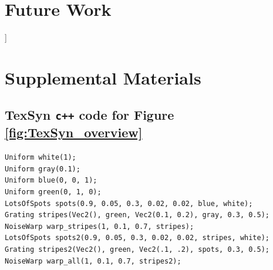 \documentclass[sigconf]{acmart}
\begin{document}
\section{Future Work}

\begin{acks}
\par
[... I've been working on this on and off since 2007, based on inspirations by papers in the early 1990s (Witkin/Kass, Turk, Angeline/Pollack, Sims) ...]
\par
[maybe just names (roughly backward in time): 
Ken Perlin,
Aaron Hertzmann,
Andrew Glassner,
Pat Hanrahan,
Karl Sims,
John Koza,
Richard Dawkins,
Witkin/Kass/Turk,
Peter Angeline,
Jordan Pollack.
and of course, Alan Turing. [too weird/maudlin? QQQ]
]
\end{acks}






\newpage
\appendix
\section{Supplemental Materials}
\subsection{TexSyn \texttt{c++} code for Figure \ref{fig:TexSyn_overview}}
\begin{small}
\begin{verbatim}
Uniform white(1);
Uniform gray(0.1);
Uniform blue(0, 0, 1);
Uniform green(0, 1, 0);
LotsOfSpots spots(0.9, 0.05, 0.3, 0.02, 0.02, blue, white);
Grating stripes(Vec2(), green, Vec2(0.1, 0.2), gray, 0.3, 0.5);
NoiseWarp warp_stripes(1, 0.1, 0.7, stripes);
LotsOfSpots spots2(0.9, 0.05, 0.3, 0.02, 0.02, stripes, white);
Grating stripes2(Vec2(), green, Vec2(.1, .2), spots, 0.3, 0.5);
NoiseWarp warp_all(1, 0.1, 0.7, stripes2);
\end{verbatim}
\end{small}

\end{document}
